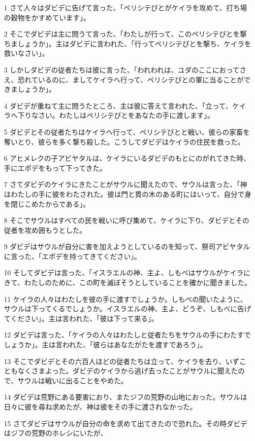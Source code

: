 \par 1 さて人々はダビデに告げて言った、「ペリシテびとがケイラを攻めて、打ち場の穀物をかすめています」。
\par 2 そこでダビデは主に問うて言った、「わたしが行って、このペリシテびとを撃ちましょうか」。主はダビデに言われた、「行ってペリシテびとを撃ち、ケイラを救いなさい」。
\par 3 しかしダビデの従者たちは彼に言った、「われわれは、ユダのここにおってさえ、恐れているのに、ましてケイラへ行って、ペリシテびとの軍に当ることができましょうか」。
\par 4 ダビデが重ねて主に問うたところ、主は彼に答えて言われた、「立って、ケイラへ下りなさい。わたしはペリシテびとをあなたの手に渡します」。
\par 5 ダビデとその従者たちはケイラへ行って、ペリシテびとと戦い、彼らの家畜を奪いとり、彼らを多く撃ち殺した。こうしてダビデはケイラの住民を救った。
\par 6 アヒメレクの子アビヤタルは、ケイラにいるダビデのもとにのがれてきた時、手にエポデをもって下ってきた。
\par 7 さてダビデのケイラにきたことがサウルに聞えたので、サウルは言った、「神はわたしの手に彼をわたされた。彼は門と貫の木のある町にはいって、自分で身を閉じこめたからである」。
\par 8 そこでサウルはすべての民を戦いに呼び集めて、ケイラに下り、ダビデとその従者を攻め囲もうとした。
\par 9 ダビデはサウルが自分に害を加えようとしているのを知って、祭司アビヤタルに言った、「エポデを持ってきてください」。
\par 10 そしてダビデは言った、「イスラエルの神、主よ、しもべはサウルがケイラにきて、わたしのために、この町を滅ぼそうとしていることを確かに聞きました。
\par 11 ケイラの人々はわたしを彼の手に渡すでしょうか。しもべの聞いたように、サウルは下ってくるでしょうか。イスラエルの神、主よ、どうぞ、しもべに告げてください」。主は言われた、「彼は下って来る」。
\par 12 ダビデは言った、「ケイラの人々はわたしと従者たちをサウルの手にわたすでしょうか」。主は言われた、「彼らはあなたがたを渡すであろう」。
\par 13 そこでダビデとその六百人ほどの従者たちは立って、ケイラを去り、いずこともなくさまよった。ダビデのケイラから逃げ去ったことがサウルに聞えたので、サウルは戦いに出ることをやめた。
\par 14 ダビデは荒野にある要害におり、またジフの荒野の山地におった。サウルは日々に彼を尋ね求めたが、神は彼をその手に渡されなかった。
\par 15 さてダビデはサウルが自分の命を求めて出てきたので恐れた。その時ダビデはジフの荒野のホレシにいたが、
